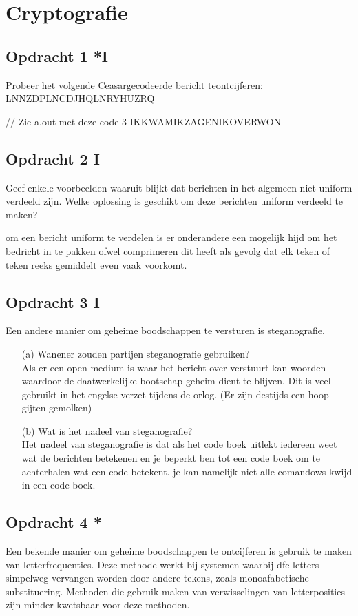 \chapter{Cryptografie}

\section{Opdracht 1 *I}
Probeer het volgende Ceasargecodeerde bericht teontcijferen:
LNNZDPLNCDJHQLNRYHUZRQ

// Zie a.out met deze code 3
IKKWAMIKZAGENIKOVERWON

\section{Opdracht 2 I}
Geef enkele voorbeelden waaruit blijkt dat berichten in het algemeen niet uniform verdeeld zijn. Welke oplossing is geschikt om deze berichten uniform verdeeld te maken?

om een bericht uniform te verdelen is er onderandere een mogelijk hijd om het bedricht in te pakken ofwel comprimeren dit heeft als gevolg dat elk teken of teken reeks gemiddelt even vaak voorkomt.

\section{Opdracht 3 I}
Een andere manier om geheime boodschappen te versturen is steganografie.
\begin{itemize}
  \item[(a)] Wanener zouden partijen steganografie gebruiken? \\
    Als er een open medium is waar het bericht over verstuurt kan woorden waardoor de daatwerkelijke bootschap geheim dient te blijven. Dit is veel gebruikt in het engelse verzet tijdens de orlog. (Er zijn destijds een hoop gijten gemolken)
  \item[(b)] Wat is het nadeel van steganografie?\\
    Het nadeel van steganografie is dat als het code boek uitlekt iedereen weet wat de berichten betekenen en je beperkt ben tot een code boek om te achterhalen wat een code betekent. je kan namelijk niet alle comandows kwijd in een code boek.
\end{itemize}

\section{Opdracht 4 *}
Een bekende manier om geheime boodschappen te ontcijferen is gebruik te maken van letterfrequenties. Deze methode werkt bij systemen waarbij dfe letters simpelweg vervangen worden door andere tekens, zoals monoafabetische substituering. Methoden die gebruik maken van verwisselingen van letterposities zijn minder kwetsbaar voor deze methoden.

